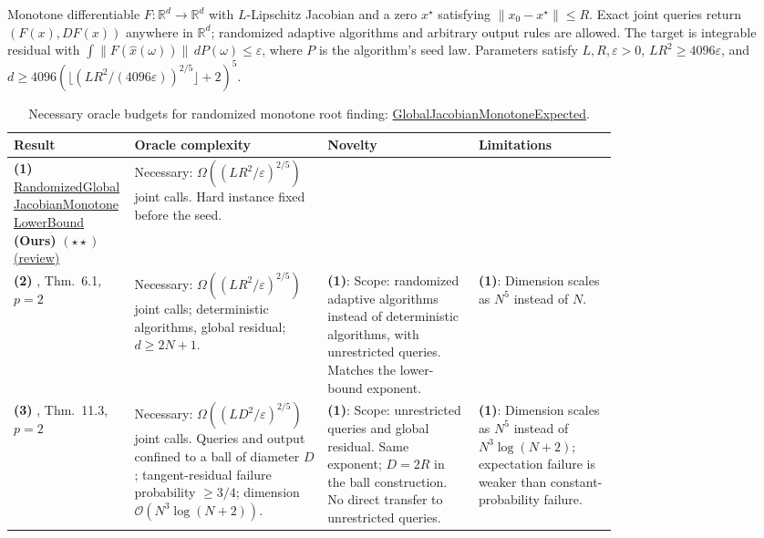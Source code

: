 \begin{table}[tp]
\centering
\caption{Necessary oracle budgets for randomized monotone root finding: \href{https://github.com/k3nfalt/longtails/blob/main/LongTails/Setups/GlobalJacobianMonotoneExpected.lean}{GlobalJacobianMonotoneExpected}.}\label{tab:GlobalJacobianMonotoneExpected}
\parbox{\linewidth}{\footnotesize Monotone differentiable $F:\mathbb{R}^d\to\mathbb{R}^d$ with $L$-Lipschitz Jacobian and a zero $x^\star$ satisfying $\|x_0-x^\star\|\le R$. Exact joint queries return $(F(x),DF(x))$ anywhere in $\mathbb{R}^d$; randomized adaptive algorithms and arbitrary output rules are allowed. The target is integrable residual with $\int\|F(\widehat x(\omega))\|\,dP(\omega)\le\varepsilon$, where $P$ is the algorithm's seed law. Parameters satisfy $L,R,\varepsilon>0$, $LR^2\ge4096\varepsilon$, and $d\ge4096(\lfloor(LR^2/(4096\varepsilon))^{2/5}\rfloor+2)^5$.}\par\smallskip
\begin{threeparttable}
\footnotesize
\setlength{\tabcolsep}{4pt}\renewcommand{\arraystretch}{1.25}
\begin{tabularx}{\linewidth}{@{}>{\raggedright\arraybackslash}p{0.20\linewidth}>{\raggedright\arraybackslash}p{0.32\linewidth}>{\raggedright\arraybackslash}p{0.25\linewidth}>{\raggedright\arraybackslash}X@{}}
\toprule
\textbf{Result} & \textbf{Oracle complexity} & \textbf{Novelty} & \textbf{Limitations} \\
\midrule
\textbf{(1)} \href{https://github.com/k3nfalt/longtails/blob/main/LongTails/Theorems/RandomizedGlobalJacobianMonotoneLowerBound.lean}{Randomized\allowbreak Global\allowbreak Jacobian\allowbreak Monotone\allowbreak Lower\allowbreak Bound} \textbf{(Ours)} $(\star\star)$ \href{https://github.com/k3nfalt/longtails/blob/main/scripts/reviews/RandomizedGlobalJacobianMonotoneLowerBound.md}{(review)} & Necessary: $\Omega((LR^2/\varepsilon)^{2/5})$ joint calls. Hard instance fixed before the seed. & & \\
\midrule[1.2pt]
\textbf{(2)} \citep{gjmeJiangYoon2026v2}, Thm.~6.1, $p=2$ & Necessary: $\Omega((LR^2/\varepsilon)^{2/5})$ joint calls; deterministic algorithms, global residual; $d\ge2N+1$. & \textbf{(1)}: Scope: randomized adaptive algorithms instead of deterministic algorithms, with unrestricted queries. Matches the lower-bound exponent. & \textbf{(1)}: Dimension scales as $N^5$ instead of $N$. \\
\midrule
\textbf{(3)} \citep{gjmeZhangEtAl2026v2}, Thm.~11.3, $p=2$ & Necessary: $\Omega((LD^2/\varepsilon)^{2/5})$ joint calls. Queries and output confined to a ball of diameter $D$; tangent-residual failure probability $\ge3/4$; dimension $\mathcal{O}(N^3\log(N+2))$. & \textbf{(1)}: Scope: unrestricted queries and global residual. Same exponent; $D=2R$ in the ball construction. No direct transfer to unrestricted queries. & \textbf{(1)}: Dimension scales as $N^5$ instead of $N^3\log(N+2)$; expectation failure is weaker than constant-probability failure. \\

\end{tabularx}
\end{threeparttable}
\end{table}
